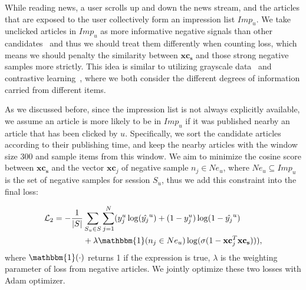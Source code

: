 While reading news, a user scrolls up and down the news stream, 
and the articles that are exposed to the user collectively 
form an impression list $Imp_u$. We take unclicked articles in $Imp_u$ as more informative negative signals than other candidates~\cite{xie2020deep} and thus 
we should treat them differently when counting loss, which means we should penalty the similarity between $\mathbf{xc_s}$ and those strong negative samples more strictly. This idea is similar to utilizing grayscale data~\cite{lin2020world} and contrastive learning~\cite{saunshi2019theoretical}, where we both consider the different degrees of information carried from different items.

As we discussed before, since the impression list is not always explicitly available, 
we assume an article is more likely to be in $Imp_u$ if it was published nearby an article that has
been clicked by $u$. Specifically, we sort the candidate articles according to their publishing time, and keep the nearby articles with the window size 300 and sample items from this window.
We aim to minimize the cosine score between $\mathbf{xc_s}$ and the vector $\mathbf{xc}_j$ of negative sample 
$n_j\in Ne_u$, where $Ne_u\subseteq Imp_u$ is the set of negative samples for session $S_u$, thus we add this constraint into the final loss: 

\begin{equation}
    \label{eq:loss}
    \begin{split}
        \mathcal{L}_2 = - \frac{1}{|S|} & \sum_{S_u \in S}\sum_{j=1}^N ( y_j^u \log(\hat{y_j}^u) + (1-y_j^u)\log(1-\hat{y_j}^u) \\
        & +  \lambda \mathbbm{1}(n_j \in Ne_u) \log(\sigma(1-\mathbf{xc}_j^T\mathbf{xc_s}))),
    \end{split}
\end{equation}
where $\mathbbm{1}(\cdot)$ returns 1 if the expression is true, $\lambda$ is 
the weighting parameter of loss from negative articles. We jointly optimize these two losses 
with Adam optimizer.

